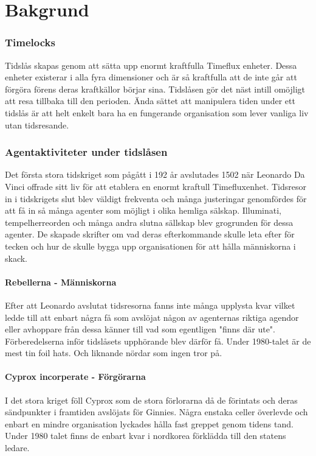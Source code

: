 \newcommand{\MyTitle}{Cricket Scenario}



\maketitle
%

\clearpage
\part{Bakgrund}
\section{Timelocks}
Tidslås skapas genom att sätta upp enormt kraftfulla Timeflux enheter. Dessa enheter existerar i alla fyra dimensioner och är så kraftfulla att de inte går att förgöra förens deras kraftkällor börjar sina. Tidslåsen gör det näst intill omöjligt att resa tillbaka till den perioden. Ända sättet att manipulera tiden under ett tidslås är att helt enkelt bara ha en fungerande organisation som lever vanliga liv utan tidsresande.
\section{Agentaktiviteter under tidslåsen}
Det första stora tidskriget som pågått i 192 år avslutades 1502 när Leonardo Da Vinci offrade sitt liv för att etablera en enormt kraftull Timefluxenhet. Tidsresor in i tidskrigets slut blev väldigt frekventa och många justeringar genomfördes för att få in så många agenter som möjligt i olika hemliga sälskap. Illuminati, tempelherreorden och många andra slutna sällskap blev grogrunden för dessa agenter. De skapade skrifter om vad deras efterkommande skulle leta efter för tecken och hur de skulle bygga upp organisationen för att hålla människorna i skack.
\subsection{Rebellerna - Människorna}
Efter att Leonardo avslutat tidsresorna fanns inte många upplysta kvar vilket ledde till att enbart några få som avslöjat någon av agenternas riktiga agendor eller avhoppare från dessa känner till vad som egentligen "finns där ute". Förberedelserna inför tidslåsets upphörande blev därför få. Under 1980-talet är de mest tin foil hats. Och liknande nördar som ingen tror på.
\subsection{Cyprox incorperate - Förgörarna}
I det stora kriget föll Cyprox som de stora förlorarna då de förintats och deras sändpunkter i framtiden avslöjats för Ginnies. Några enstaka celler överlevde och enbart en mindre organisation lyckades hålla fast greppet genom tidens tand. Under 1980 talet finns de enbart kvar i nordkorea förklädda till den statens ledare.
